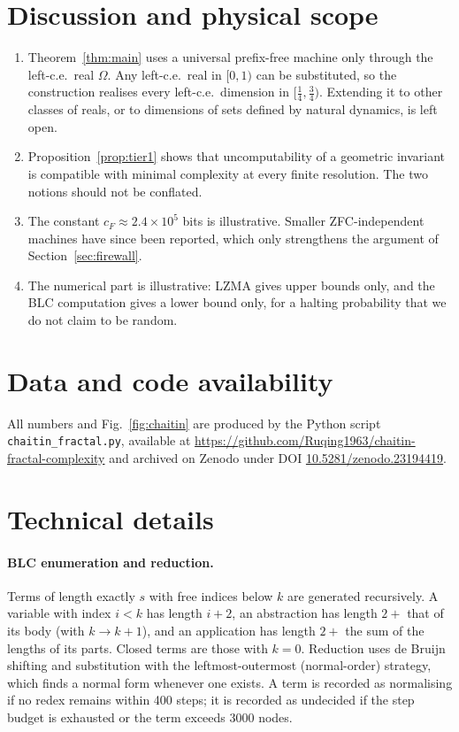 \documentclass[11pt]{article}
\theoremstyle{definition}\newtheorem{definition}{Definition}[section]
\theoremstyle{remark}\newtheorem*{remark}{Remark}
\begin{document}
\section{Discussion and physical scope}
\label{sec:discussion}
\begin{enumerate}
\item Theorem~\ref{thm:main} uses a universal prefix-free machine only through the left-c.e.\ real $\Omega$. Any
left-c.e.\ real in $[0,1)$ can be substituted, so the construction realises every left-c.e.\ dimension in
$[\frac14,\frac34)$. Extending it to other classes of reals, or to dimensions of sets defined by natural dynamics,
is left open.
\item Proposition~\ref{prop:tier1} shows that uncomputability of a geometric invariant is compatible with
minimal complexity at every finite resolution. The two notions should not be conflated.
\item The constant $c_F\approx2.4\times10^5$ bits is illustrative. Smaller ZFC-independent machines have since been
reported, which only strengthens the argument of Section~\ref{sec:firewall}.
\item The numerical part is illustrative: LZMA gives upper bounds only, and the BLC computation gives a lower bound
only, for a halting probability that we do not claim to be random.
\end{enumerate}

\section*{Data and code availability}
All numbers and Fig.~\ref{fig:chaitin} are produced by the Python script \texttt{chaitin\_fractal.py}, available
at \url{https://github.com/Ruqing1963/chaitin-fractal-complexity} and archived on Zenodo under DOI
\href{https://doi.org/10.5281/zenodo.23194419}{10.5281/zenodo.23194419}.

\appendix
\section{Technical details}
\label{app:tech}

\paragraph{BLC enumeration and reduction.} Terms of length exactly $s$ with free indices below $k$ are generated
recursively. A variable with index $i<k$ has length $i+2$, an abstraction has length $2+$ that of its body (with
$k\to k+1$), and an application has length $2+$ the sum of the lengths of its parts. Closed terms are those with
$k=0$. Reduction uses de Bruijn shifting and substitution with the leftmost-outermost (normal-order) strategy,
which finds a normal form whenever one exists. A term is recorded as normalising if no redex remains within 400
steps; it is recorded as undecided if the step budget is exhausted or the term exceeds 3000 nodes.
\end{document}

